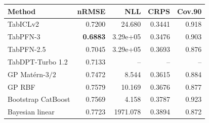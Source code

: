 \begin{tabular}{lrrrr}
\toprule Method & nRMSE & NLL & CRPS & Cov.90 \\
\midrule
TabICLv2 & 0.7200 & 24.680 & 0.3441 & 0.918 \\
TabPFN-3 & \textbf{0.6883} & 3.29e+05 & 0.3476 & 0.903 \\
TabPFN-2.5 & 0.7045 & 3.29e+05 & 0.3693 & 0.876 \\
TabDPT-Turbo 1.2 & 0.7133 & -- & -- & -- \\
GP Mat\'ern-$3/2$ & 0.7472 & 8.544 & 0.3615 & 0.884 \\
GP RBF & 0.7579 & 10.169 & 0.3676 & 0.877 \\
Bootstrap CatBoost & 0.7569 & 4.158 & 0.3787 & 0.923 \\
Bayesian linear & 0.7723 & 1971.078 & 0.3894 & 0.872 \\
\bottomrule
\end{tabular}
